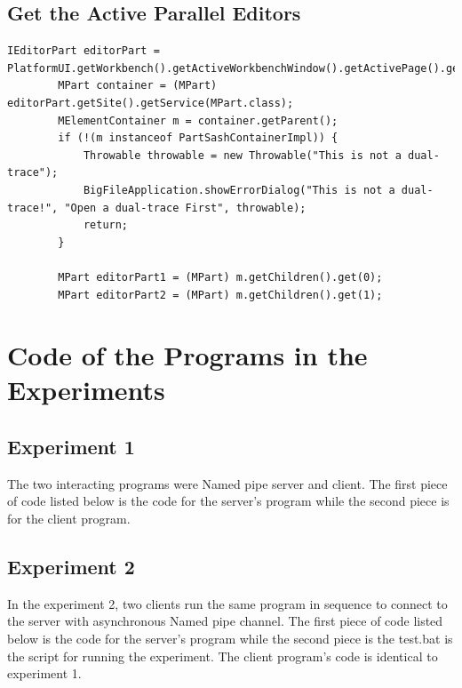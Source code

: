 \documentclass[12pt,oneside]{book}
\begin{document}
\begin{appendices}
\section{Get the Active Parallel Editors}
\begin{lstlisting}[caption= code for getting parallel editors ]
IEditorPart editorPart = PlatformUI.getWorkbench().getActiveWorkbenchWindow().getActivePage().getActiveEditor();
		MPart container = (MPart) editorPart.getSite().getService(MPart.class);
		MElementContainer m = container.getParent();
		if (!(m instanceof PartSashContainerImpl)) {
			Throwable throwable = new Throwable("This is not a dual-trace");
			BigFileApplication.showErrorDialog("This is not a dual-trace!", "Open a dual-trace First", throwable);
			return;
		}

		MPart editorPart1 = (MPart) m.getChildren().get(0);
		MPart editorPart2 = (MPart) m.getChildren().get(1);
\end{lstlisting}

\chapter{Code of the Programs in the Experiments}\label{expcode}
\section{Experiment 1}
The two interacting programs were Named pipe server and client. The first piece of code listed below is the code for the server's program while the second piece is for the client program.



\section{Experiment 2}
In the experiment 2, two clients run the same program in sequence to connect to the server with asynchronous Named pipe channel. The first piece of code listed below is the code for the server's program while the second piece is the test.bat is the script for running the experiment. The client  program's code is identical to experiment 1.



\end{appendices}



\end{document}
